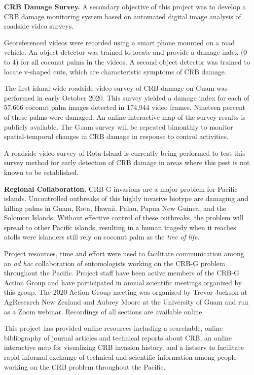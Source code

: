 \documentclass[12pt,letterpaper,english,bibliography=totocnumbered,abstract=on]{scrartcl}
\begin{document}
	
	\textbf{CRB Damage Survey.} A secondary objective of this project was to develop a CRB damage monitoring system based on automated digital image analysis of roadside video surveys.
	
	Georeferenced videos were recorded using a smart phone mounted on a road vehicle. An object detector was trained to locate and provide a damage index (0 to 4) for all coconut palms in the videos. A second object detector was trained to locate v-shaped cuts, which are characteristic symptoms of CRB damage.
	
	The first island-wide roadside video survey of CRB damage on Guam was performed in early October 2020.  This survey yielded a damage index for each of 57,666 coconut palm images detected in 174,944 video frames. Nineteen percent of these palms were damaged. An online interactive map of the survey results is publicly available. The Guam survey will be repeated bimonthly to monitor spatial-temporal changes in CRB damage in response to control activities.
	
	A roadside video survey of Rota Island is currently being performed to test this survey method for early detection of CRB damage in areas where this pest is not known to be established.
	

	\textbf{Regional Collaboration.} CRB-G invasions are a major problem for Pacific islands. Uncontrolled outbreaks of this highly invasive biotype are damaging and killing palms in Guam, Rota, Hawaii, Palau, Papua New Guinea, and the Solomon Islands. Without effective control of these outbreaks, the problem will spread to other Pacific islands, resulting in a human tragedy when it reaches atolls were islanders still rely on coconut palm as the \textit{tree of life}. 
	
	Project resources, time and effort were used to facilitate communication among an \textit{ad hoc} collaboration of entomologists working on the CRB-G problem throughout the Pacific. Project staff have been active members of the CRB-G Action Group and have participated in annual scientific meetings organized by this group. The 2020 Action Group meeting was organized by Trevor Jackson at AgResearch New Zealand and Aubrey Moore at the University of Guam and run as a Zoom webinar. Recordings of all sections are available online. 
	
	This project has provided online resources including a searchable, online bibliography of journal articles and technical reports about CRB, an online interactive map for visualizing CRB invasion history, and a listserv to facilitate rapid informal exchange of technical and scientific information among people working on the CRB problem throughout the Pacific.
\end{document}
